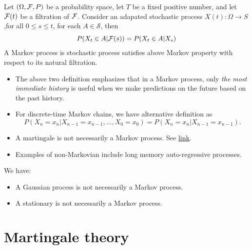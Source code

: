 \begin{refsection}
\begin{definition}
\cite{wiki:markovprocess}Let $(\Omega,\mathcal{F},P)$ be a probability space, let $T$ be a fixed positive number, and let $\mathcal{F}(t)$ be a filtration of $\mathcal{F}$. Consider an adapated stochastic process $X(t):\Omega \to S$,for all $0\leq s \leq t$, for each $A\in \mathcal{S}$, then
$$P(X_t \in A|\mathcal{F}(s)) = P(X_t\in A| X_s)$$
A Markov process is stochastic process satisfies above Markov property with respect to its natural filtration.
\end{definition}

\begin{remark}\hfill
\begin{itemize}
    \item The above two definition emphasizes that in a Markov process, only \emph{the most immediate history} is useful when we make predictions on the future based on the past history.
    \item For discrete-time Markov chains, we have alternative definition as
    $$P(X_n = x_n | X_{n-1}=x_{n-1},...,X_0 = x_0) = P(X_n=x_n | X_{n-1}=x_{n-1}).$$
    \item A martingale is not necessarily a Markov process. See \href{http://math.stackexchange.com/questions/503245/stochastic-process-that-is-martingale-but-not-markov}{link}.
    \item Examples of non-Markovian include long memory auto-regressive processes. 
\end{itemize}
\end{remark}


\begin{remark} We have:
	\begin{itemize}
		\item A Gaussian process is not necessarily a Markov process. 
		\item A stationary is not necessarily a Markov process. 
	\end{itemize}
	
\end{remark}

\section{Martingale theory}

\end{refsection}
